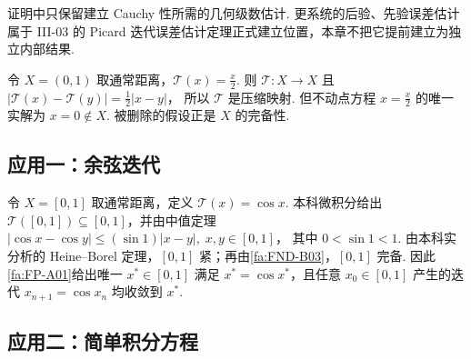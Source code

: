 \begin{FARemark}[关于迭代估计的依赖边界]
证明中只保留建立 Cauchy 性所需的几何级数估计. 更系统的后验、先验误差估计属于 III-03 的 Picard 迭代误差估计定理正式建立位置，本章不把它提前建立为独立内部结果.
\end{FARemark}

\begin{FACounterexample}[完备性不可删除]
令 \(\displaystyle X=(0,1)\) 取通常距离，\(\displaystyle \mathcal T(x)=\frac{x}{2}\). 则 \(\displaystyle \mathcal T:X\to X\) 且 \(\displaystyle |\mathcal T(x)-\mathcal T(y)|=\frac12|x-y|\)，
所以 \(\displaystyle \mathcal T\) 是压缩映射. 但不动点方程 \(\displaystyle x=\frac{x}{2}\) 的唯一实解为 \(\displaystyle x=0\notin X\). 被删除的假设正是 \(\displaystyle X\) 的完备性.
\end{FACounterexample}

\subsection{应用一：余弦迭代}

\begin{FAApplication}[\(\displaystyle x_{n+1}=\cos x_n\)]
令 \(\displaystyle X=[0,1]\) 取通常距离，定义 \(\displaystyle \mathcal T(x)=\cos x\). 本科微积分给出 \(\displaystyle \mathcal T([0,1])\subseteq[0,1]\)，并由中值定理 \(\displaystyle |\cos x-\cos y|\leqslant (\sin1)|x-y|, \; x,y\in[0,1]\)，
其中 \(\displaystyle 0<\sin1<1\). 由本科实分析的 Heine--Borel 定理，\(\displaystyle [0,1]\) 紧；再由\autoref{fa:FND-B03}，\(\displaystyle [0,1]\) 完备. 因此\autoref{fa:FP-A01}给出唯一 \(\displaystyle x^*\in[0,1]\) 满足 \(\displaystyle x^*=\cos x^*\)，且任意 \(\displaystyle x_0\in[0,1]\) 产生的迭代 \(\displaystyle x_{n+1}=\cos x_n\) 均收敛到 \(\displaystyle x^*\).
\end{FAApplication}

\clearpage
\subsection{应用二：简单积分方程}

